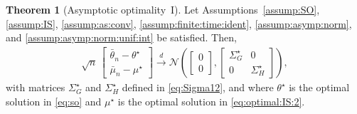 \documentclass[11pt,a4paper]{article}
\theoremstyle{definition}
\newtheorem{theorem}{Theorem}[section]
\begin{document}
\begin{theorem}[Asymptotic optimality~I]
\label{thm:asymp:norm}
Let Assumptions~\ref{assump:SO}, \ref{assump:IS}, \ref{assump:as:conv}, \ref{assump:finite:time:ident}, \ref{assump:asymp:norm}, and \ref{assump:asymp:norm:unif:int} be satisfied. Then,
\begin{align*}
    \sqrt{n}\, \begin{bmatrix}
        \bar{\theta}_n - \theta^\star \\ \bar{\mu}_n - \mu^\star
    \end{bmatrix}  \overset{d}{\to} \mathcal N \left( \begin{bmatrix} 0 \\ 0 \end{bmatrix}, \begin{bmatrix}
        \Sigma_G^\star & 0 \\ 0 & \Sigma_H^\star
    \end{bmatrix}\right),
\end{align*}
with matrices $\Sigma_G^\star$ and $\Sigma_H^\star$ defined in \eqref{eq:Sigma12}, and where $\theta^\star$ is the optimal solution in \eqref{eq:so} and $\mu^\star$ is the optimal solution in \eqref{eq:optimal:IS:2}.
\end{theorem}
\end{document}
